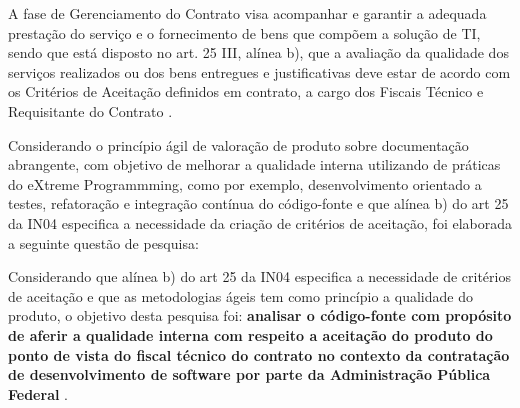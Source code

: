 A fase de Gerenciamento do Contrato visa acompanhar e garantir a adequada prestação do serviço e o fornecimento de bens que compõem a solução de TI, sendo que está disposto no art. 25 III, alínea b), que a avaliação da qualidade dos serviços realizados ou dos bens entregues e justificativas deve estar de acordo com os Critérios de Aceitação definidos em contrato, a cargo dos Fiscais Técnico e Requisitante do Contrato \cite{IN04:2010}.

Considerando o princípio ágil de valoração de produto sobre documentação abrangente, com objetivo de melhorar a qualidade interna utilizando de práticas do eXtreme Programmming, como por exemplo, desenvolvimento orientado a testes, refatoração e integração contínua do código-fonte \cite{beck1999} e que alínea b) do art 25 da IN04 especifica a necessidade da criação de critérios de aceitação, foi elaborada a seguinte questão de pesquisa: 

Considerando que alínea b) do art 25 da IN04 especifica a necessidade de critérios de aceitação e que as metodologias ágeis tem como princípio a qualidade do produto, o objetivo desta pesquisa foi:
\textbf{analisar o código-fonte
com propósito de aferir a qualidade interna
com respeito a aceitação do produto
do ponto de vista do fiscal técnico do contrato
no contexto da contratação de desenvolvimento de software por parte da Administração Pública Federal
}.